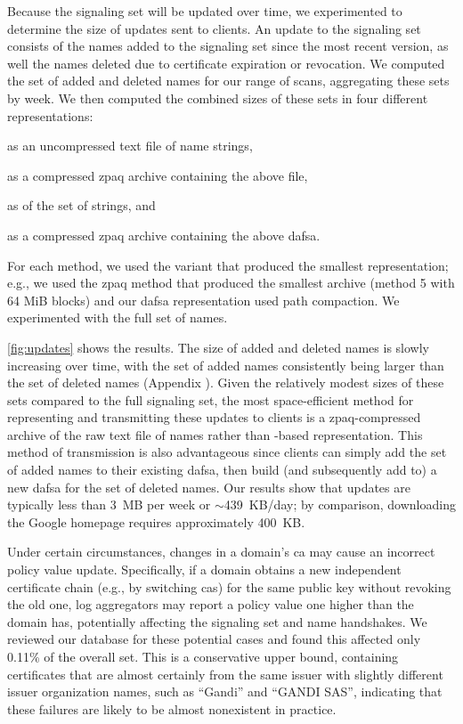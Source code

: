 Because the signaling set will be updated over time, we 
experimented to determine the size of updates sent to clients. An
update to the signaling set consists of the names added to the signaling set
since the most recent version, as well the names deleted due to certificate
expiration or revocation. We computed the set of added and deleted names for our
range of scans, aggregating these sets by week. We then computed the combined
sizes of these sets in four different representations:
\begin{inparaenum}[(1)]
\item as an uncompressed text file of name strings,
\item as a compressed zpaq archive containing the above file,
\item as  of the set of strings, and
\item as a compressed zpaq archive containing the above \ac{dafsa}.
\end{inparaenum}
For each method, we used the variant that produced the smallest representation;
e.g., we used the zpaq method that produced the smallest archive (method
5 with 64 MiB blocks) and our \ac{dafsa} representation used path compaction.
We experimented with the full set of names.

\autoref{fig:updates} shows the results. The size of added and deleted names is
slowly increasing over time, with the set of added names consistently being
larger than the set of deleted names (Appendix ). Given the
relatively modest sizes of these sets compared to the full signaling
set, the most space-efficient method for representing and transmitting these
updates to clients is a zpaq-compressed archive of the raw text file of names
rather than -based representation. This method of transmission is
also advantageous since clients can simply add the set of added names to their
existing \ac{dafsa}, then build (and subsequently add to) a new \ac{dafsa} for
the set of deleted names. Our results show that updates are typically less than
3~MB per week or $\sim$439~KB/day; by comparison, downloading the Google
homepage requires approximately 400~KB.

Under certain circumstances, changes in a domain's \ac{ca} may cause an
incorrect policy value update. Specifically, if a domain obtains a new
independent certificate chain (e.g., by switching \acp{ca}) for the same public
key without revoking the old one, log aggregators may report a policy value one
higher than the domain has, potentially affecting the signaling set and
\ac{name} handshakes. We reviewed our database for these potential cases and
found this affected only 0.11\% of the overall set. This
is a conservative upper bound, containing certificates that are almost certainly
from the same issuer with slightly different issuer organization names, such as
``Gandi'' and ``GANDI SAS'', indicating that these failures are likely to be
almost nonexistent in practice.

